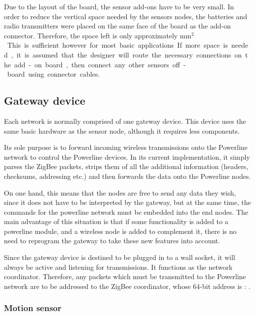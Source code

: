 Due to the layout of the board, the sensor add-ons have to be very small. In
order to reduce the vertical space needed by the sensors nodes, the batteries
and radio transmitters were placed on the same face of the board as the add-on
connector. Therefore, the space left is only approximately \unit[22x20]{mm$^2$}.
This is sufficient however for most basic applications. If more space is needed,
it is assumed that the designer will route the necessary connections on the
add-on board, then connect any other sensors off-board using connector cables.


\subsection{Gateway device}

Each network is normally comprised of one gateway device. This device uses the
same basic hardware as the sensor node, although it requires less components.


Its sole purpose is to forward incoming wireless transmissions onto the
Powerline network to control the Powerline devices. In its current
implementation, it simply parses the ZigBee packets, strips them of all the
additional information (headers, checksums, addressing etc.) and then forwards
the data onto the Powerline nodes.

On one hand, this means that the nodes are free to send any data they wish,
since it does not have to be interpreted by the gateway, but at the same time,
the commands for the powerline network must be embedded into the end nodes. The
main advantage of this situation is that if some functionality is added to a
powerline module, and a wireless node is added to complement it, there is no
need to reprogram the gateway to take these new features into account.

Since the gateway device is destined to be plugged in to a wall socket, it will
always be active and listening for transmissions. It functions as the network
coordinator. Therefore, any packets which must be transmitted to the Powerline
network are to be addressed to the ZigBee coordinator, whose 64-bit address is :
.

\subsubsection{Motion sensor}


